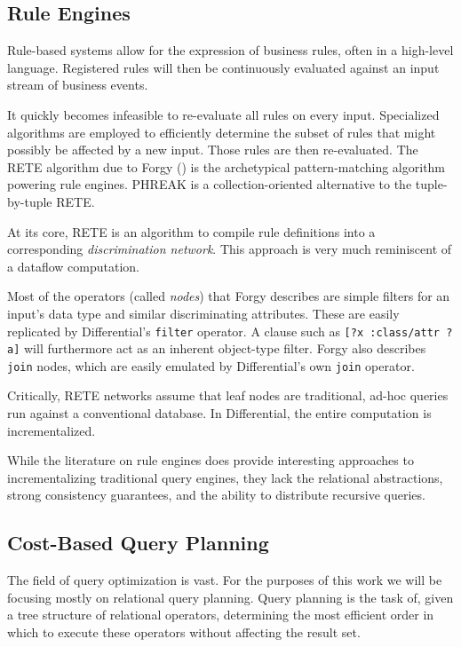 \documentclass[../index.tex]{subfiles}
\begin{document}
\subsection{Rule Engines}

Rule-based systems allow for the expression of business rules, often
in a high-level language. Registered rules will then be continuously
evaluated against an input stream of business events. 

It quickly becomes infeasible to re-evaluate all rules on every
input. Specialized algorithms are employed to efficiently determine
the subset of rules that might possibly be affected by a new
input. Those rules are then re-evaluated. The RETE algorithm due to
Forgy (\cite{forgy1989rete}) is the archetypical pattern-matching
algorithm powering rule engines. PHREAK \cite{drools} is a
collection-oriented alternative to the tuple-by-tuple RETE.

At its core, RETE is an algorithm to compile rule definitions into a
corresponding \emph{discrimination network}. This approach is very
much reminiscent of a dataflow computation.

Most of the operators (called \emph{nodes}) that Forgy describes are
simple filters for an input's data type and similar discriminating
attributes. These are easily replicated by Differential's
\texttt{filter} operator. A clause such as \texttt{[?x :class/attr
    ?a]} will furthermore act as an inherent object-type filter.
Forgy also describes \texttt{join} nodes, which are easily emulated by
Differential's own \texttt{join} operator.

Critically, RETE networks assume that leaf nodes are traditional,
ad-hoc queries run against a conventional database. In Differential,
the entire computation is incrementalized.

While the literature on rule engines does provide interesting
approaches to incrementalizing traditional query engines, they lack
the relational abstractions, strong consistency guarantees, and the
ability to distribute recursive queries.

\subsection{Cost-Based Query Planning}

The field of query optimization is vast. For the purposes of this work
we will be focusing mostly on relational query planning. Query
planning is the task of, given a tree structure of relational
operators, determining the most efficient order in which to execute
these operators without affecting the result set.
\end{document}
